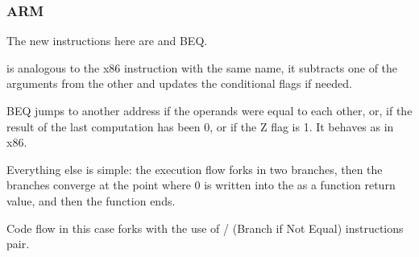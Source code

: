 \subsubsection{ARM}





The new instructions here are \CMP and \ac{BEQ}.

\CMP is analogous to the x86 instruction with the same name, it subtracts one of the arguments from the other and updates the conditional flags if needed.

\ac{BEQ} jumps to another address if the operands were equal to each other, or,
if the result of the last computation has been 0, or if the Z flag is 1.
It behaves as \JZ in x86.

Everything else is simple: the execution flow forks in two branches, then the branches
converge at the point where 0 is written into the  as a function return value, and then the function ends.




Code flow in this case forks with the use of / (Branch if Not Equal) instructions pair.

